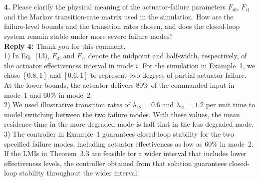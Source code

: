 \documentclass[10pt,fleqn]{article}
\begin{document}
~\\
\\
\textbf{4.} Please clarify the physical meaning of the actuator-failure parameters $F_{i0}$, $F_{i1}$ and the Markov transition-rate matrix used in the simulation. How are the failure-level bounds and the transition rates chosen, and does the closed-loop system remain stable under more severe failure modes?
\\[10pt]
\indent \textbf{Reply 4:} Thank you for this comment.\\

1) In Eq.~(13), $F_{i0}$ and $F_{i1}$ denote the midpoint and half-width, respectively, of the actuator effectiveness interval in mode $i$. For the simulation in Example~1, we chose $[0.8,1]$ and $[0.6,1]$ to represent two degrees of partial actuator failure. At the lower bounds, the actuator delivers $80\%$ of the commanded input in mode~1 and $60\%$ in mode~2.\\

2) We used illustrative transition rates of $\lambda_{12}=0.6$ and $\lambda_{21}=1.2$ per unit time to model switching between the two failure modes. With these values, the mean residence time in the more degraded mode is half that in the less degraded mode.\\

3) The controller in Example~1 guarantees closed-loop stability for the two specified failure modes, including actuator effectiveness as low as $60\%$ in mode~2. If the LMIs in Theorem~3.3 are feasible for a wider interval that includes lower effectiveness levels, the controller obtained from that solution guarantees closed-loop stability throughout the wider interval.
\end{document}
